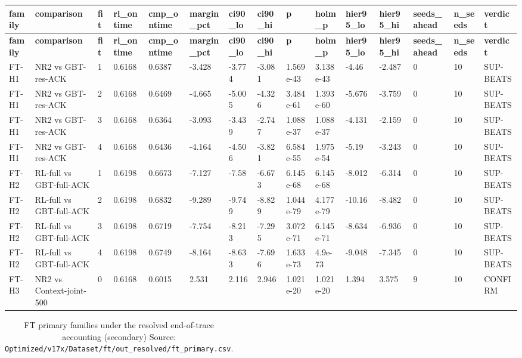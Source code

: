 \documentclass[10pt]{article}
\begin{document}
\begin{landscape}
\begin{longtable}{@{}lllllllllllllll@{}}
\toprule
\textbf{family} & \textbf{comparison} & \textbf{fit} & \textbf{rl\_ontime} & \textbf{cmp\_ontime} & \textbf{margin\_pct} & \textbf{ci90\_lo} & \textbf{ci90\_hi} & \textbf{p} & \textbf{holm\_p} & \textbf{hier95\_lo} & \textbf{hier95\_hi} & \textbf{seeds\_ahead} & \textbf{n\_seeds} & \textbf{verdict} \\
\midrule
\endfirsthead
\toprule
\textbf{family} & \textbf{comparison} & \textbf{fit} & \textbf{rl\_ontime} & \textbf{cmp\_ontime} & \textbf{margin\_pct} & \textbf{ci90\_lo} & \textbf{ci90\_hi} & \textbf{p} & \textbf{holm\_p} & \textbf{hier95\_lo} & \textbf{hier95\_hi} & \textbf{seeds\_ahead} & \textbf{n\_seeds} & \textbf{verdict} \\
\midrule
\endhead
FT-H1 & NR2 vs GBT-res-ACK & 1 & 0.6168 & 0.6387 & -3.428 & -3.774 & -3.081 & 1.569e-43 & 3.138e-43 & -4.46 & -2.487 & 0 & 10 & SUP-BEATS \\
FT-H1 & NR2 vs GBT-res-ACK & 2 & 0.6168 & 0.6469 & -4.665 & -5.005 & -4.326 & 3.484e-61 & 1.393e-60 & -5.676 & -3.759 & 0 & 10 & SUP-BEATS \\
FT-H1 & NR2 vs GBT-res-ACK & 3 & 0.6168 & 0.6364 & -3.093 & -3.439 & -2.747 & 1.088e-37 & 1.088e-37 & -4.131 & -2.159 & 0 & 10 & SUP-BEATS \\
FT-H1 & NR2 vs GBT-res-ACK & 4 & 0.6168 & 0.6436 & -4.164 & -4.506 & -3.821 & 6.584e-55 & 1.975e-54 & -5.19 & -3.243 & 0 & 10 & SUP-BEATS \\
FT-H2 & RL-full vs GBT-full-ACK & 1 & 0.6198 & 0.6673 & -7.127 & -7.58 & -6.673 & 6.145e-68 & 6.145e-68 & -8.012 & -6.314 & 0 & 10 & SUP-BEATS \\
FT-H2 & RL-full vs GBT-full-ACK & 2 & 0.6198 & 0.6832 & -9.289 & -9.749 & -8.829 & 1.044e-79 & 4.177e-79 & -10.16 & -8.482 & 0 & 10 & SUP-BEATS \\
FT-H2 & RL-full vs GBT-full-ACK & 3 & 0.6198 & 0.6719 & -7.754 & -8.213 & -7.295 & 3.072e-71 & 6.145e-71 & -8.634 & -6.936 & 0 & 10 & SUP-BEATS \\
FT-H2 & RL-full vs GBT-full-ACK & 4 & 0.6198 & 0.6749 & -8.164 & -8.633 & -7.696 & 1.633e-73 & 4.9e-73 & -9.048 & -7.345 & 0 & 10 & SUP-BEATS \\
FT-H3 & NR2 vs Context-joint-500 & 0 & 0.6168 & 0.6015 & 2.531 & 2.116 & 2.946 & 1.021e-20 & 1.021e-20 & 1.394 & 3.575 & 9 & 10 & CONFIRM \\
\bottomrule
\end{longtable}
\normalsize
\tiny
\setlength{\tabcolsep}{2pt}
\begin{longtable}{@{}lllllllllllllll@{}}
\caption{FT primary families under the resolved end-of-trace accounting (secondary) Source: \texttt{Optimized/v17x/Dataset/ft/out\_resolved/ft\_primary.csv}.}\\

\end{longtable}
\end{landscape}
\end{document}
